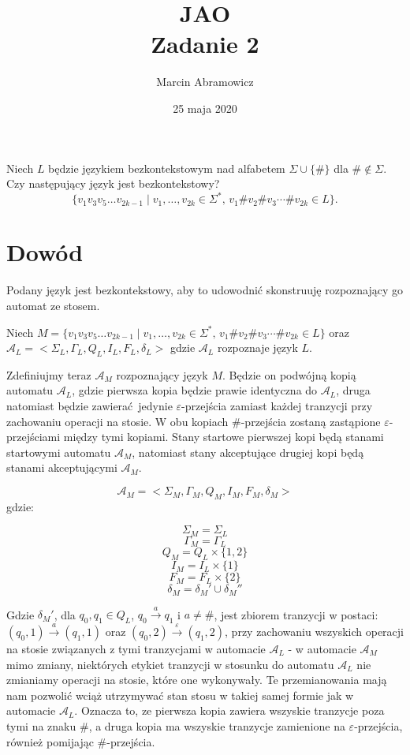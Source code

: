 \documentclass[a4paper]{article}
\title{JAO\\ Zadanie 2}
\date{25 maja 2020}
\author{Marcin Abramowicz}
\newcommand{\eps}{\varepsilon}%
\newcommand{\N}{\mathbb N}%
\newcommand{\set}[1]{\{#1\}}%
\newcommand{\setof}[2]{\{#1\mid #2\}}%
\newcommand{\aut}[1]{\mathcal {#1}}%
\newcommand{\tran}[1]{\xrightarrow{#1}}%
\begin{document}
\maketitle

Niech $L$ będzie językiem bezkontekstowym nad alfabetem $\Sigma\cup\set\#$ dla $\#\notin\Sigma$.
Czy następujący język jest bezkontekstowy? 
$$\setof{v_1v_3v_5\ldots v_{2k-1}}{ \textrm{$v_1,\ldots,v_{2k}\in \Sigma^*$, $v_1\#v_2\#v_3\cdots\#v_{2k}\in L$}}.$$

\section*{Dowód}
Podany język jest bezkontekstowy, aby to udowodnić skonstruuję rozpoznający go automat ze stosem.

Niech $M = \setof{v_1v_3v_5\ldots v_{2k-1}}{ \textrm{$v_1,\ldots,v_{2k}\in \Sigma^*$, $v_1\#v_2\#v_3\cdots\#v_{2k}\in L$}}$ 
oraz $\aut A_L = <\Sigma_L, \Gamma_L, Q_L, I_L, F_L, \delta_L>$
gdzie $\aut A_L$ rozpoznaje język $L$. 

Zdefiniujmy teraz $\aut A_M$ rozpoznający język $M$. Będzie on podwójną kopią automatu $\aut A_L$, gdzie pierwsza kopia będzie prawie identyczna do $\aut A_L$, druga natomiast będzie zawierać jedynie $\eps$-przejścia zamiast każdej tranzycji przy zachowaniu operacji na stosie. W obu kopiach $\#$-przejścia zostaną zastąpione $\eps$-przejściami między tymi kopiami. Stany startowe pierwszej kopi będą stanami startowymi automatu $\aut A_M$, natomiast stany akceptujące drugiej kopi będą stanami akceptującymi $\aut A_M$.

$$\aut A_M = <\Sigma_M, \Gamma_M, Q_M, I_M, F_M, \delta_M>$$
gdzie:

$$\Sigma_M = \Sigma_L$$
$$\Gamma_M = \Gamma_L$$
$$Q_M = Q_L \times \set{1, 2}$$
$$I_M = I_L \times \set{1}$$
$$F_M = F_L \times \set{2}$$
$$\delta_M = \delta_M' \cup \delta_M''$$

Gdzie $\delta_M'$, dla $q_0, q_1 \in Q_L$, $q_0\tran a q_1$ i $a \ne \#$, jest zbiorem tranzycji w postaci: $(q_0, 1) \tran a (q_1, 1)$ oraz $(q_0, 2) \tran \eps (q_1, 2)$, przy zachowaniu wszyskich operacji na stosie związanych z tymi tranzycjami w automacie $\aut A_L$ - w automacie $\aut A_M$ mimo zmiany, niektórych etykiet tranzycji w stosunku do automatu $\aut A_L$ nie zmianiamy operacji na stosie, które one wykonywały. Te przemianowania mają nam pozwolić wciąż utrzymywać stan stosu w takiej samej formie jak w automacie $\aut A_L$. Oznacza to, ze pierwsza kopia zawiera wszyskie tranzycje poza tymi na znaku $\#$, a druga kopia ma wszyskie tranzycje zamienione na $\eps$-przejścia, również pomijając $\#$-przejścia.
\end{document}

